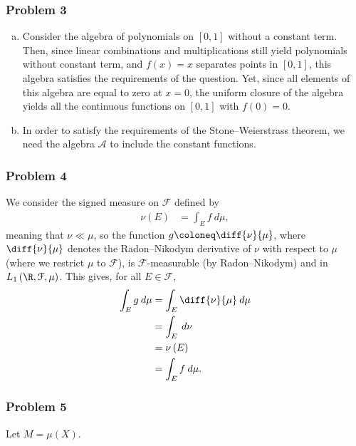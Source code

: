 \documentclass[10pt]{mypackage}
\begin{document}
\subsubsection{Problem 3}%
\begin{enumerate}[(a)]
  \item Consider the algebra of polynomials on $[0,1]$ without a constant term. Then, since linear combinations and multiplications still yield polynomials without constant term, and $f(x) = x$ separates points in $[0,1]$, this algebra satisfies the requirements of the question. Yet, since all elements of this algebra are equal to zero at $x= 0$, the uniform closure of the algebra yields all the continuous functions on $[0,1]$ with $f(0) = 0$.
  \item In order to satisfy the requirements of the Stone--Weierstrass theorem, we need the algebra $\mathcal{A}$ to include the constant functions.
\end{enumerate}
\subsubsection{Problem 4}%
We consider the signed measure on $ \mathcal{F} $ defined by
\begin{align*}
  \nu(E) &= \int_{E}^{} f\:d\mu,
\end{align*}
meaning that $\nu\ll \mu$, so the function $g \coloneq \diff{\nu}{\mu}$, where $\diff{\nu}{\mu}$ denotes the Radon--Nikodym derivative of $\nu$ with respect to $\mu$ (where we restrict $\mu$ to $\mathcal{F}$), is $\mathcal{F}$-measurable (by Radon--Nikodym) and in $L_1\left( \R,\mathcal{F},\mu \right)$. This gives, for all $E\in \mathcal{F}$,
\begin{align*}
  \int_{E}^{} g\:d\mu &= \int_{E}^{} \diff{\nu}{\mu}\:d\mu\\
                      &= \int_{E}^{} \:d\nu\\
                      &= \nu\left( E \right)\\
                      &= \int_{E}^{} f\:d\mu.
\end{align*}
\subsubsection{Problem 5}%
Let $M = \mu(X)$.\newline
\end{document}
